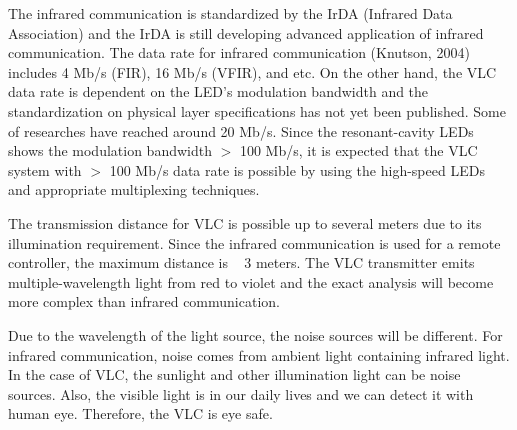 
The infrared communication is standardized by the IrDA (Infrared Data Association) and
the IrDA is still developing advanced application of infrared communication. The data rate
for infrared communication (Knutson, 2004) includes 4 Mb/s (FIR), 16 Mb/s (VFIR), and etc.
On the other hand, the VLC data rate is dependent on the LED’s modulation bandwidth and
the standardization on physical layer specifications has not yet been published. Some of researches have reached around 20 Mb/s. Since the resonant-cavity LEDs shows the modulation bandwidth $>$ 100 Mb/s, it is expected that the VLC system with $>$ 100 Mb/s
data rate is possible by using the high-speed LEDs and appropriate multiplexing techniques.

The transmission distance for VLC is possible up to several meters due to its illumination
requirement. Since the infrared communication is used for a remote controller, the
maximum distance is ~ 3 meters. The VLC transmitter emits multiple-wavelength light from
red to violet and the exact analysis will become more complex than infrared communication.

Due to the wavelength of the light source, the noise sources will be different. For infrared
communication, noise comes from ambient light containing infrared light. In the case of
VLC, the sunlight and other illumination light can be noise sources. Also, the visible light is
in our daily lives and we can detect it with human eye. Therefore, the VLC is eye safe.

